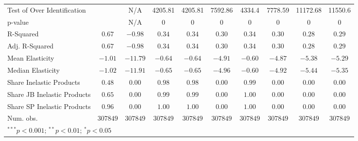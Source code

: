 \begin{tabular}{l c c c c c c c c c}
Test of Over Identification &               & N/A           & 4205.81       & 4205.81       & 7592.86       & 4334.4        & 7778.59       & 11172.68      & 11550.6       \\
p-value                     &               & N/A           & 0             & 0             & 0             & 0             & 0             & 0             & 0             \\
R-Squared                   & $0.67$        & $-0.98$       & $0.34$        & $0.34$        & $0.30$        & $0.34$        & $0.30$        & $0.28$        & $0.29$        \\
Adj. R-Squared              & $0.67$        & $-0.98$       & $0.34$        & $0.34$        & $0.30$        & $0.34$        & $0.30$        & $0.28$        & $0.29$        \\
Mean Elasticity             & $-1.01$       & $-11.79$      & $-0.64$       & $-0.64$       & $-4.91$       & $-0.60$       & $-4.87$       & $-5.38$       & $-5.29$       \\
Median Elasticity           & $-1.02$       & $-11.91$      & $-0.65$       & $-0.65$       & $-4.96$       & $-0.60$       & $-4.92$       & $-5.44$       & $-5.35$       \\
Share Inelastic Products    & $0.48$        & $0.00$        & $0.98$        & $0.98$        & $0.00$        & $0.99$        & $0.00$        & $0.00$        & $0.00$        \\
Share JB Inelastic Products & $0.65$        & $0.00$        & $0.99$        & $0.99$        & $0.00$        & $1.00$        & $0.00$        & $0.00$        & $0.00$        \\
Share SP Inelastic Products & $0.96$        & $0.00$        & $1.00$        & $1.00$        & $0.00$        & $1.00$        & $0.00$        & $0.00$        & $0.00$        \\
Num. obs.                   & $307849$      & $307849$      & $307849$      & $307849$      & $307849$      & $307849$      & $307849$      & $307849$      & $307849$      \\
\bottomrule
\multicolumn{10}{l}{\scriptsize{$^{***}p<0.001$; $^{**}p<0.01$; $^{*}p<0.05$}}
\end{tabular}
